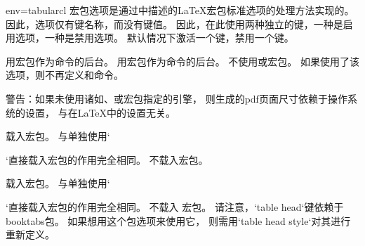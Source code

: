 \begin{tableobject}{env=tabular}{cl}
宏包选项是通过\autocite{clsguide}中描述的\LaTeX{}宏包标准选项的处理方法实现的。
因此，选项仅有键名称，而没有键值。
因此，在此使用两种独立的键，一种是启用选项，一种是禁用选项。
默认情况下\radioon{}激活一个键，\radiooff{}禁用一个键。

 用宏包作为命令的后台。
 用宏包作为命令的后台。
 不使用或宏包。
   如果使用了该选项，则不再定义和命令。

   警告：如果未使用诸如、或宏包指定的引擎，
   则生成的pdf页面尺寸依赖于操作系统的设置， 
   与在\LaTeX{}中的设置无关\autocite{texexchange_papersize}。

 载入宏包。
  与单独使用`\usepackage{array}`直接载入宏包的作用完全相同。
 不载入宏包。

 载入宏包。
  与单独使用`\usepackage{booktabs}`直接载入宏包的作用完全相同。
 不载入  宏包。
  请注意，`table head`键依赖于booktabs包。
  如果想用这个包选项来使用它，
  则需用`table head style`对其进行重新定义。


\end{tableobject}
